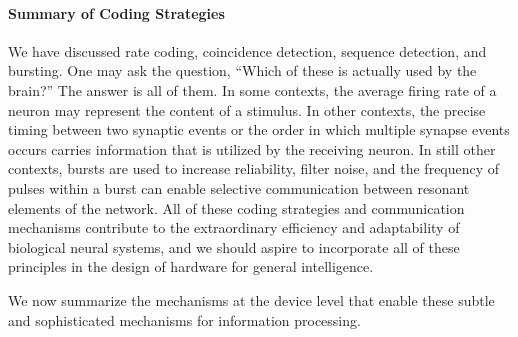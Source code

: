 \documentclass[twocolumn]{article}
\begin{document}
\paragraph{\label{sec:coding_strategies_summary}Summary of Coding Strategies}
We have discussed rate coding, coincidence detection, sequence detection, and bursting. One may ask the question, ``Which of these is actually used by the brain?'' The answer is all of them. In some contexts, the average firing rate of a neuron may represent the content of a stimulus. In other contexts, the precise timing between two synaptic events or the order in which multiple synapse events occurs carries information that is utilized by the receiving neuron. In still other contexts, bursts are used to increase reliability, filter noise, and the frequency of pulses within a burst can enable selective communication between resonant elements of the network. All of these coding strategies and communication mechanisms contribute to the extraordinary efficiency and adaptability of biological neural systems, and we should aspire to incorporate all of these principles in the design of hardware for general intelligence. 

We now summarize the mechanisms at the device level that enable these subtle and sophisticated mechanisms for information processing.
\end{document}
